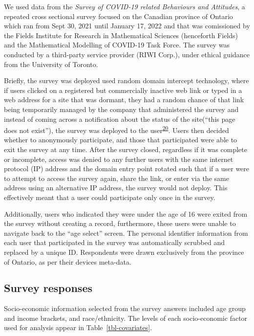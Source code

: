 \documentclass[
  letterpaper,
  DIV=11,
  numbers=noendperiod]{scrartcl}
\begin{document}
We used data from the \emph{Survey of COVID-19 related Behaviours and
Attitudes}, a repeated cross sectional survey focused on the Canadian
province of Ontario which ran from Sept 30, 2021 until January 17, 2022
and that was comissioned by the Fields Institute for Research in
Mathematical Sciences (henceforth Fields) and the Mathematical Modelling
of COVID-19 Task Force. The survey was conducted by a third-party
service provider (RIWI Corp.), under ethical guidance from the
University of Toronto.

Briefly, the survey was deployed used random domain intercept
technology, where if users clicked on a registered but commercially
inactive web link or typed in a web address for a site that was dormant,
they had a random chance of that link being temporarily managed by the
company that administered the survey and instead of coming across a
notification about the status of the site(``this page does not exist''),
the survey was deployed to the
user\textsuperscript{\protect\hyperlink{ref-sargent2022}{20}}. Users
then decided whether to anonymously participate, and those that
participated were able to exit the survey at any time. After the survey
closed, regardless if it was complete or incomplete, access was denied
to any further users with the same internet protocol (IP) address and
the domain entry point rotated such that if a user were to attempt to
access the survey again, share the link, or enter via the same address
using an alternative IP address, the survey would not deploy. This
effectively meant that a user could participate only once in the survey.

Additionally, users who indicated they were under the age of 16 were
exited from the survey without creating a record, furthermore, these
users were unable to navigate back to the ``age select'' screen. The
personal identifier information from each user that participated in the
survey was automatically scrubbed and replaced by a unique ID.
Respondents were drawn exclusively from the province of Ontario, as per
their devices meta-data.

\hypertarget{sec-socio-demographic-factors}{%
\subsection{Survey responses}\label{sec-socio-demographic-factors}}

Socio-economic information selected from the survey answers included age
group and income brackets, and race/ethnicity. The levels of each
socio-economic factor used for analysis appear in
Table~\ref{tbl-covariates}.
\end{document}
